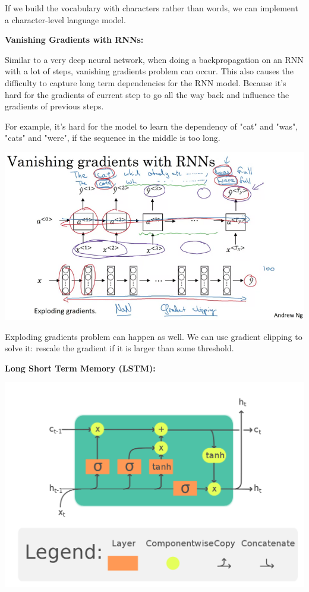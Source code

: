 \documentclass{article}
\begin{document}
\noindent If we build the vocabulary with characters rather than words, we can implement a character-level language model.

\bigskip

\noindent \textbf{Vanishing Gradients with RNNs:}

\noindent Similar to a very deep neural network, when doing a backpropagation on an RNN with a lot of steps, vanishing gradients problem can occur. This also causes the difficulty to capture long term dependencies for the RNN model. Because it's hard for the gradients of current step to go all the way back and influence the gradients of previous steps.

\bigskip

\noindent For example, it's hard for the model to learn the dependency of "cat" and "was", "cats" and "were", if the sequence in the middle is too long.

\begin{center}
\includegraphics[scale=0.4]{./images/rnn_vanishing_gradients.png}
\end{center}

\noindent Exploding gradients problem can happen as well. We can use gradient clipping to solve it: rescale the gradient if it is larger than some threshold.

\bigskip

\noindent \textbf{Long Short Term Memory (LSTM):}

\begin{center}
\includegraphics[scale=0.2]{./images/lstm.png}
\end{center}
\end{document}
